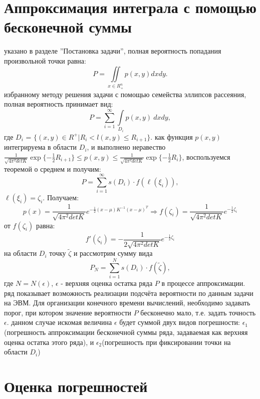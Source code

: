 \section{Аппроксимация интеграла с помощью бесконечной  суммы}
 указано в разделе ''Постановка задачи'', полная вероятность попадания произвольной точки равна:
 $$P = \iint\limits_{x\in R^n_+}p(x,y)dxdy.$$
 избранному методу решения задачи с помощью семейства эллипсов рассеяния, полная вероятность принимает вид:
 $$P = \sum_{i=1}^\infty\int\limits_{D_i}p(x,y)\ dxdy,$$
 где $D_i$ = $\{(x,y)\in R^{+}|R_i<l(x,y)\le R_{i+1}\}$.
 как функция $p(x,y)$ интегрируема в области $D_i$, и выполнено неравество $\frac{1}{\sqrt{4\pi^2detK}}\exp\{-\frac{1}{2}R_{i+1}\}\le{p(x,y)}\le \frac{1}{\sqrt{4\pi^2detK}}\exp\{-\frac{1}{2}R_{i}\}$, воспользуемся теоремой о среднем и получим:
$$P = \sum_{i =1}^\infty s(D_i)\cdot f(\ell(\xi_i)),$$
 $\ell(\xi_i)=\zeta_i$. Получаем:
$$p(x) = \frac{1}{\sqrt{4\pi^2detK}}e^{-\frac{1}{2}(x-\mu)K^{-1}(x-\mu)^{T}}\Rightarrow f(\zeta_i) = \frac{1}{\sqrt{4\pi^2detK}}e^{-\frac{1}{2}\zeta_i}$$
 от $f(\zeta_i)$ равна:
$$f'(\zeta_i) = -\frac{1}{2\sqrt{4\pi^2detK}}e^{-\frac{1}{2}\zeta_i}$$
 на области $D_i$ точку $\tilde{\zeta}$ и рассмотрим сумму вида
$$P_N = \sum_{i =1}^N s(D_i)\cdot f(\tilde{\zeta}),$$
где $N = N(\epsilon)$, $\epsilon$ - верхняя оценка остатка ряда $P$ в процессе аппроксимации.
 ряд показывает возможность реализации подсчёта вероятности по данным задачи на ЭВМ. Для организации конечного времени вычислений, необходимо задавать порог, при котором значение вероятности $P$ бесконечно мало, т.е. задать точность $\epsilon$.
 данном случае искомая величина $\epsilon$ будет суммой двух видов погрешности: $\epsilon_1$(погрешность аппроксимации бесконечной суммы ряда, задаваемая как верхняя оценка остатка этого ряда), и $\epsilon_2$(погрешность при фиксировании точки на области $D_i$)
 \section{Оценка погрешностей}
